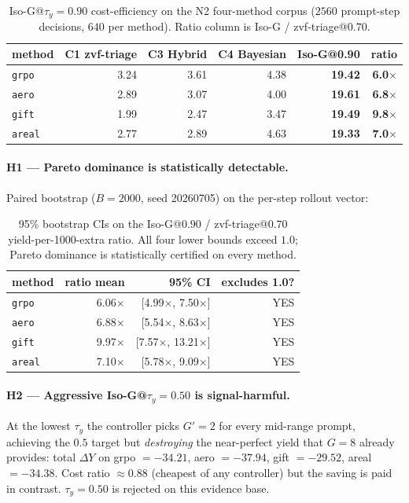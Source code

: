 \documentclass{article}
\begin{document}
\begin{table}[t]
\centering\small
\caption{Iso-G@$\tau_y{=}0.90$ cost-efficiency on the N2 four-method
corpus ($2560$ prompt-step decisions, $640$ per method).  Ratio column
is Iso-G / zvf-triage@$0.70$.}
\label{tab:p7-iso-g-cost-eff}
\begin{tabular}{lrrrrr}
\toprule
method & C1 zvf-triage & C3 Hybrid & C4 Bayesian & \textbf{Iso-G@0.90} & \textbf{ratio} \\
\midrule
\texttt{grpo}  &  3.24 &  3.61 &  4.38 &  \textbf{19.42} & \textbf{6.0$\times$} \\
\texttt{aero}  &  2.89 &  3.07 &  4.00 &  \textbf{19.61} & \textbf{6.8$\times$} \\
\texttt{gift}  &  1.99 &  2.47 &  3.47 &  \textbf{19.49} & \textbf{9.8$\times$} \\
\texttt{areal} &  2.77 &  2.89 &  4.63 &  \textbf{19.33} & \textbf{7.0$\times$} \\
\bottomrule
\end{tabular}
\end{table}

\paragraph{H1 --- Pareto dominance is statistically detectable.}
Paired bootstrap ($B{=}2000$, seed 20260705) on the per-step rollout
vector:

\begin{table}[t]
\centering\small
\caption{95\% bootstrap CIs on the Iso-G@$0.90$ / zvf-triage@$0.70$
yield-per-1000-extra ratio.  All four lower bounds exceed $1.0$;
Pareto dominance is statistically certified on every method.}
\label{tab:p7-iso-g-ci}
\begin{tabular}{lrrr}
\toprule
method & ratio mean & 95\% CI & excludes 1.0? \\
\midrule
\texttt{grpo}  &  6.06$\times$ & [4.99$\times$, 7.50$\times$] & YES \\
\texttt{aero}  &  6.88$\times$ & [5.54$\times$, 8.63$\times$] & YES \\
\texttt{gift}  &  9.97$\times$ & [7.57$\times$, 13.21$\times$] & YES \\
\texttt{areal} &  7.10$\times$ & [5.78$\times$, 9.09$\times$] & YES \\
\bottomrule
\end{tabular}
\end{table}

\paragraph{H2 --- Aggressive Iso-G@$\tau_y{=}0.50$ is signal-harmful.}
At the lowest $\tau_y$ the controller picks $G'{=}2$ for every
mid-range prompt, achieving the $0.5$ target but \emph{destroying}
the near-perfect yield that $G{=}8$ already provides:
total $\Delta Y$ on grpo $=-34.21$, aero $=-37.94$, gift $=-29.52$,
areal $=-34.38$.  Cost ratio $\approx 0.88$ (cheapest of any
controller) but the saving is paid in contrast.  $\tau_y{=}0.50$
is rejected on this evidence base.
\end{document}
